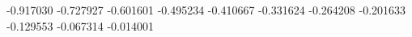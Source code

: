 -0.917030
-0.727927
-0.601601
-0.495234
-0.410667
-0.331624
-0.264208
-0.201633
-0.129553
-0.067314
-0.014001
